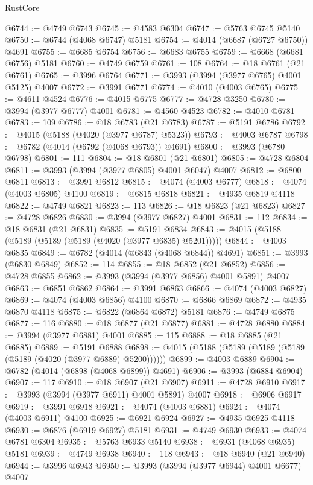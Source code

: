 \begin{lexlean}{RustCore}
\begin{coremodule}
@6744 := @4749 @6743
@6745 := @4583 @6304
@6747 := @5763 @6745 @5140
@6750 := @6744 (@4068 @6747) @5181
@6754 := @4014 (@6687 (@6727 @6750)) @4691
@6755 := @6685 @6754
@6756 := @6683 @6755
@6759 := @6668 (@6681 @6756) @5181
@6760 := @4749 @6759
@6761 := 108
@6764 := @18 @6761 (@21 @6761)
@6765 := @3996 @6764
@6771 := @3993 (@3994 (@3977 @6765) @4001 @5125) @4007
@6772 := @3991 @6771
@6774 := @4010 (@4003 @6765)
@6775 := @4611 @4524
@6776 := @4015 @6775
@6777 := @4728 @3250
@6780 := @3994 (@3977 @6777) @4001
@6781 := @4560 @4523
@6782 := @4010 @6781
@6783 := 109
@6786 := @18 @6783 (@21 @6783)
@6787 := @5191 @6786
@6792 := @4015 (@5188 (@4020 (@3977 @6787) @5323))
@6793 := @4003 @6787
@6798 := @6782 (@4014 (@6792 (@4068 @6793)) @4691)
@6800 := @3993 (@6780 @6798)
@6801 := 111
@6804 := @18 @6801 (@21 @6801)
@6805 := @4728 @6804
@6811 := @3993 (@3994 (@3977 @6805) @4001 @6047) @4007
@6812 := @6800 @6811
@6813 := @3991 @6812
@6815 := @4074 (@4003 @6777)
@6818 := @4074 (@4003 @6805) @4100
@6819 := @6815 @6818
@6821 := @4935 @6819 @4118
@6822 := @4749 @6821
@6823 := 113
@6826 := @18 @6823 (@21 @6823)
@6827 := @4728 @6826
@6830 := @3994 (@3977 @6827) @4001
@6831 := 112
@6834 := @18 @6831 (@21 @6831)
@6835 := @5191 @6834
@6843 := @4015 (@5188 (@5189 (@5189 (@5189 (@4020 (@3977 @6835) @5201)))))
@6844 := @4003 @6835
@6849 := @6782 (@4014 (@6843 (@4068 @6844)) @4691)
@6851 := @3993 (@6830 @6849)
@6852 := 114
@6855 := @18 @6852 (@21 @6852)
@6856 := @4728 @6855
@6862 := @3993 (@3994 (@3977 @6856) @4001 @5891) @4007
@6863 := @6851 @6862
@6864 := @3991 @6863
@6866 := @4074 (@4003 @6827)
@6869 := @4074 (@4003 @6856) @4100
@6870 := @6866 @6869
@6872 := @4935 @6870 @4118
@6875 := @6822 (@6864 @6872) @5181
@6876 := @4749 @6875
@6877 := 116
@6880 := @18 @6877 (@21 @6877)
@6881 := @4728 @6880
@6884 := @3994 (@3977 @6881) @4001
@6885 := 115
@6888 := @18 @6885 (@21 @6885)
@6889 := @5191 @6888
@6898 := @4015 (@5188 (@5189 (@5189 (@5189 (@5189 (@4020 (@3977 @6889) @5200))))))
@6899 := @4003 @6889
@6904 := @6782 (@4014 (@6898 (@4068 @6899)) @4691)
@6906 := @3993 (@6884 @6904)
@6907 := 117
@6910 := @18 @6907 (@21 @6907)
@6911 := @4728 @6910
@6917 := @3993 (@3994 (@3977 @6911) @4001 @5891) @4007
@6918 := @6906 @6917
@6919 := @3991 @6918
@6921 := @4074 (@4003 @6881)
@6924 := @4074 (@4003 @6911) @4100
@6925 := @6921 @6924
@6927 := @4935 @6925 @4118
@6930 := @6876 (@6919 @6927) @5181
@6931 := @4749 @6930
@6933 := @4074 @6781 @6304
@6935 := @5763 @6933 @5140
@6938 := @6931 (@4068 @6935) @5181
@6939 := @4749 @6938
@6940 := 118
@6943 := @18 @6940 (@21 @6940)
@6944 := @3996 @6943
@6950 := @3993 (@3994 (@3977 @6944) @4001 @6677) @4007

\end{coremodule}
\end{lexlean}
